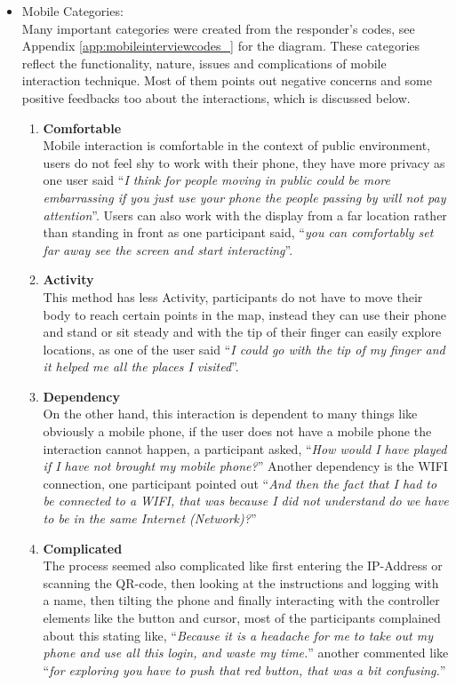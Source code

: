 \begin{itemize}

\item Mobile Categories: \\
Many important categories were created from the responder's codes, see Appendix \ref{app:mobileinterviewcodes_} for the diagram. These categories reflect the functionality, nature, issues and complications of mobile interaction technique. Most of them points out negative concerns and some positive feedbacks too about the interactions, which is discussed below.
\begin{enumerate}
\item	\textbf{Comfortable} \\
	Mobile interaction is comfortable in the context of public environment, users do not feel shy to work with their phone, they have more privacy as one user said ``\emph{I think for people moving in public could be more embarrassing if you just use your phone the people passing by will not pay attention}''. Users can also work with the display from a far location rather than standing in front as one participant said, ``\emph{you can comfortably set far away see the screen and start interacting}''.
\item	\textbf{Activity} \\
	This method has less Activity, participants do not have to move their body to reach certain points in the map, instead they can use their phone and stand or sit steady and with the tip of their finger can easily explore locations, as one of the user said ``\emph{I could go with the tip of my finger and it helped me all the places I visited}''.
\item	\textbf{Dependency}\\
	On the other hand, this interaction is dependent to many things like obviously a mobile phone, if the user does not have a mobile phone the interaction cannot happen, a participant asked, ``\emph{How would I have played if I have not brought my mobile phone?}'' Another dependency is the WIFI connection, one participant pointed out ``\emph{And then the fact that I had to be connected to a WIFI, that was because I did not understand do we have to be in the same Internet (Network)?}'' 

\item	\textbf{Complicated}\\
The process seemed also complicated like first entering the IP-Address or scanning the QR-code, then looking at the instructions and logging with a name, then tilting the phone and finally interacting with the controller elements like the button and cursor, most of the participants complained about this stating like, ``\emph{Because it is a headache for me to take out my phone and use all this login, and waste my time.}'' another commented like ``\emph{for exploring you have to push that red button, that was a bit confusing.}''



\end{enumerate}
\end{itemize}
